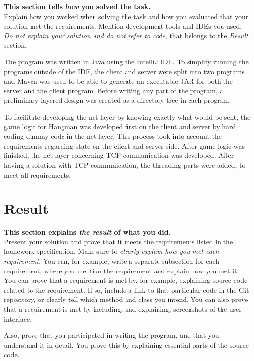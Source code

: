 \documentclass[a4paper]{scrartcl}
\begin{document}
\textbf{This section tells \textit{how} you solved the task.} \\

\noindent Explain how you worked when solving the task and how you evaluated that your solution met the requirements. Mention development tools and IDEs you used. \textit{Do not explain your solution and do not refer to code}, that belongs to the \textit{Result} section.

\noindent The program was written in Java using the IntelliJ IDE. To simplify running the programs outside of the IDE, the client and server were split into two programs and Maven was used to be able to generate an executable JAR for both the server and the client program. Before writing any part of the program, a preliminary layered design was created as a directory tree in each program.

To facilitate developing the net layer by knowing exactly what would be sent, the game logic for Hangman was developed first on the client and server by hard coding dummy code in the net layer. This process took into account the requirements regarding state on the client and server side. After game logic was finished, the net layer concerning TCP communication was developed. After having a solution with TCP communication, the threading parts were added, to meet all requirements.

\section{Result}

\textbf{This section explains \textit{the result} of what you did.} \\

\noindent Present your solution and prove that it meets the requirements listed in the homework specification. Make sure to  \textit{clearly explain how you met each requirement}. You can, for example, write a separate subsection for each requirement, where you mention the requirement and explain how you met it. You can prove that a requirement is met by, for example, explaining source code related to the requirement. If so, include a link to that particular code in the Git repository, or clearly tell which method and class you intend. You can also prove that a requirement is met by including, and explaining, screenshots of the user interface.

Also, prove that you participated in writing the program, and that you understand it in detail. You prove this by explaining essential parts of the source code.
\end{document}
